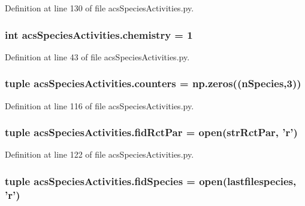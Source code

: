 Definition at line 130 of file acs\-Species\-Activities.\-py.

\hypertarget{a00097_a5459c566e6ccdf02747a3c16089a5593}{
\subsubsection[{chemistry}]{\setlength{\rightskip}{0pt plus 5cm}int acs\-Species\-Activities.\-chemistry = 1}}\label{a00097_a5459c566e6ccdf02747a3c16089a5593}


Definition at line 43 of file acs\-Species\-Activities.\-py.

\hypertarget{a00097_a6afffdd046bbc3bc4fbee34b561fcae5}{
\subsubsection[{counters}]{\setlength{\rightskip}{0pt plus 5cm}tuple acs\-Species\-Activities.\-counters = np.\-zeros((n\-Species,3))}}\label{a00097_a6afffdd046bbc3bc4fbee34b561fcae5}


Definition at line 116 of file acs\-Species\-Activities.\-py.

\hypertarget{a00097_a64247b23c199d0b0d0d60f02ec8682e3}{
\subsubsection[{fid\-Rct\-Par}]{\setlength{\rightskip}{0pt plus 5cm}tuple acs\-Species\-Activities.\-fid\-Rct\-Par = open({\bf str\-Rct\-Par}, '{\bf r}')}}\label{a00097_a64247b23c199d0b0d0d60f02ec8682e3}


Definition at line 122 of file acs\-Species\-Activities.\-py.

\hypertarget{a00097_a240d5b3cd72043528f4b674a8ba00a33}{
\subsubsection[{fid\-Species}]{\setlength{\rightskip}{0pt plus 5cm}tuple acs\-Species\-Activities.\-fid\-Species = open({\bf lastfilespecies}, '{\bf r}')}}\label{a00097_a240d5b3cd72043528f4b674a8ba00a33}


